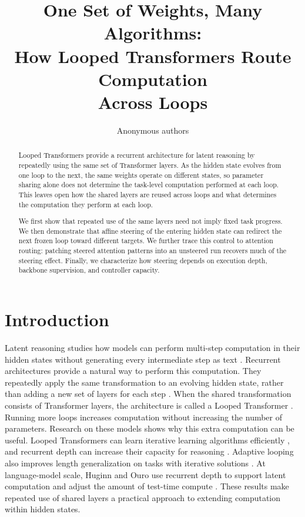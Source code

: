 \documentclass{article}
\title{One Set of Weights, Many Algorithms:\\How Looped Transformers Route Computation\\Across Loops}
\author{Anonymous authors}
\begin{document}
\maketitle

\begin{abstract}
Looped Transformers provide a recurrent architecture for latent reasoning by repeatedly using the same set of Transformer layers.
As the hidden state evolves from one loop to the next, the same weights operate on different states, so parameter sharing alone does not determine the task-level computation performed at each loop.
This leaves open how the shared layers are reused across loops and what determines the computation they perform at each loop.

We first show that repeated use of the same layers need not imply fixed task progress.
We then demonstrate that affine steering of the entering hidden state can redirect the next frozen loop toward different targets.
We further trace this control to attention routing: patching steered attention patterns into an unsteered run recovers much of the steering effect.
Finally, we characterize how steering depends on execution depth, backbone supervision, and controller capacity.
\end{abstract}

\section{Introduction}
\label{sec:intro}

Latent reasoning studies how models can perform multi-step computation in their hidden states without generating every intermediate step as text \citep{saunshi2025looped,geiping2025scaling}. Recurrent architectures provide a natural way to perform this computation. They repeatedly apply the same transformation to an evolving hidden state, rather than adding a new set of layers for each step \citep{dehghani2019universal}. When the shared transformation consists of Transformer layers, the architecture is called a Looped Transformer \citep{yang2024learning,fan2025looped}. Running more loops increases computation without increasing the number of parameters. Research on these models shows why this extra computation can be useful. Looped Transformers can learn iterative learning algorithms efficiently \citep{yang2024learning}, and recurrent depth can increase their capacity for reasoning \citep{saunshi2025looped}. Adaptive looping also improves length generalization on tasks with iterative solutions \citep{fan2025looped}. At language-model scale, Huginn and Ouro use recurrent depth to support latent computation and adjust the amount of test-time compute \citep{geiping2025scaling,zhu2025ouro}. These results make repeated use of shared layers a practical approach to extending computation within hidden states.
\end{document}
